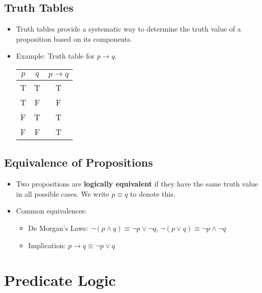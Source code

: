 \documentclass{article}
\begin{document}
\subsection{Truth Tables}
\begin{itemize}
    \item Truth tables provide a systematic way to determine the truth value of a proposition based on its components.
    \item Example: Truth table for $p \to q$.
    \begin{center}
        \begin{tabular}{|c|c|c|}
            \hline
            $p$ & $q$ & $p \to q$ \\
            \hline
            T & T & T \\
            T & F & F \\
            F & T & T \\
            F & F & T \\
            \hline
        \end{tabular}
    \end{center}
\end{itemize}

\subsection{Equivalence of Propositions}
\begin{itemize}
    \item Two propositions are \textbf{logically equivalent} if they have the same truth value in all possible cases. We write $p \equiv q$ to denote this.
    \item Common equivalences:
    \begin{itemize}
        \item De Morgan's Laws: $\neg (p \land q) \equiv \neg p \lor \neg q$, $\neg (p \lor q) \equiv \neg p \land \neg q$
        \item Implication: $p \to q \equiv \neg p \lor q$
    \end{itemize}
\end{itemize}

\section{Predicate Logic}
\end{document}
